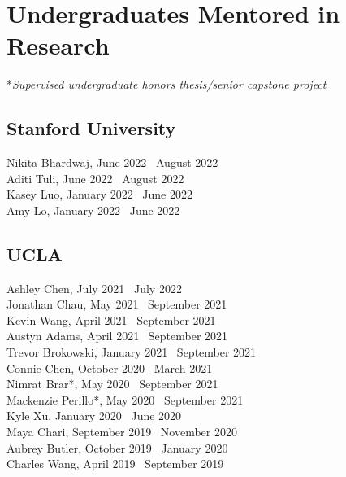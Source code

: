 \section*{Undergraduates Mentored in Research}
*\textit{Supervised undergraduate honors thesis/senior capstone project}

\subsection*{Stanford University}
Nikita Bhardwaj, June 2022 \textendash\ August 2022\\
Aditi Tuli, June 2022 \textendash\ August 2022\\
Kasey Luo, January 2022 \textendash\ June 2022\\
Amy Lo, January 2022 \textendash\ June 2022

\subsection*{UCLA}
Ashley Chen, July 2021 \textendash\ July 2022\\
Jonathan Chau, May 2021 \textendash\ September 2021\\
Kevin Wang, April 2021 \textendash\ September 2021\\
Austyn Adams, April 2021 \textendash\ September 2021\\
Trevor Brokowski, January 2021 \textendash\ September 2021\\
Connie Chen, October 2020 \textendash\ March 2021\\
Nimrat Brar*, May 2020 \textendash\ September 2021\\
Mackenzie Perillo*, May 2020 \textendash\ September 2021\\
Kyle Xu, January 2020 \textendash\ June 2020\\
Maya Chari, September 2019 \textendash\ November 2020\\
Aubrey Butler, October 2019 \textendash\ January 2020\\
Charles Wang, April 2019 \textendash\ September 2019